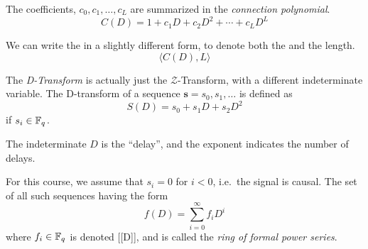 \begin{definition}\label{def:Connection_Polynomial}
  The coefficients, $c_{0}, c_{1}, \ldots, c_{L}$ are summarized in the \emph{connection polynomial}.
  \begin{equation}\label{eq:Connection_Polynomial}
    C(D) = 1 + c_{1}D + c_{2}D^{2} + \cdots + c_{L}D^{L}
  \end{equation}

  \begin{remark}\label{rmk:Connection_Polynomial-Alternate_Form}
    We can write the  in a slightly different form, to denote both the  and the length.
    \begin{equation}\label{eq:Connection_Polynomial-Alternate_Form}
      \langle C(D), L \rangle
    \end{equation}
  \end{remark}
\end{definition}

\begin{definition}[D-Transform]\label{def:D_Transform}
  The \emph{D-Transform} is actually just the $\mathcal{Z}$-Transform, with a different indeterminate variable.
  The D-transform of a sequence $\mathbf{s} = s_{0}, s_{1}, \ldots$ is defined as
  \begin{equation}\label{eq:D_Transform_Sequence}
    S(D) = s_{0} + s_{1}D + s_{2}D^{2}
  \end{equation}
  if $s_{i} \in \mathbb{F}_{q^{}}$.

  The indeterminate $D$ is the ``delay'', and the exponent indicates the number of delays.

  \begin{remark}
    For this course, we assume that $s_{i} = 0$ for $i < 0$, i.e.\ the signal is causal.
    The set of all such sequences having the form
    \begin{equation*}
      f(D) = \sum\limits_{i=0}^{\infty} f_{i}D^{i}
    \end{equation*}
    where $f_{i} \in \mathbb{F}_{q^{}}$ is denoted [[D]], and is called the \emph{ring of formal power series}.
  \end{remark}
\end{definition}

